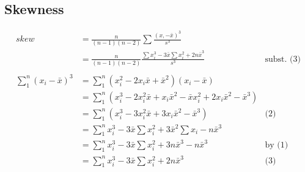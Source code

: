 \documentclass[11pt]{article} %
\begin{document}
\subsection{Skewness}
\begin{align*}
skew &= \frac{n}{(n-1)(n-2)}\sum\frac{(x,-\bar{x})^3}{s^3} \\
        &= \frac{n}{(n-1)(n-2)}\frac{\sum x_i^3 - 3\bar{x}\sum x_i^2 + 2n\bar{x}^3}{s^3} & \text{subst. (3)}\\
\\
\sum_1^n {(x_i - \bar{x})^3} &= \sum_1^n (x_i^2 - 2x_i\bar{x} + \bar{x}^2)(x_i - \bar{x}) \\
                                &= \sum_1^n (x_i^3 - 2x_i^2\bar{x} + x_i\bar{x}^2 - \bar{x} x_i^2 + 2x_i\bar{x}^2 - \bar{x}^3) \\
                                &= \sum_1^n (x_i^3 - 3x_i^2\bar{x} + 3x_i\bar{x}^2 - \bar{x}^3) & \text{(2)}\\
                                &= \sum_1^n x_i^3 - 3\bar{x}\sum x_i^2 + 3\bar{x}^2\sum x_i - n\bar{x}^3 \\
                                &= \sum_1^n x_i^3 - 3\bar{x}\sum x_i^2 + 3n\bar{x}^3 - n\bar{x}^3 & \text{by (1)} \\
                                &= \sum_1^n x_i^3 - 3\bar{x}\sum x_i^2 + 2n\bar{x}^3 & \text{(3)} \\
\end{align*}
\end{document}
